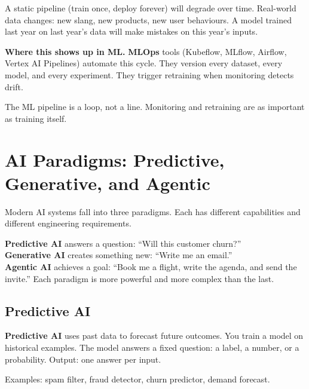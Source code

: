 \documentclass[a4paper,11pt]{article}
\newcommand{\vocab}[1]{\textbf{\color{navy}#1}}
\begin{document}
\begin{watchout}
A static pipeline (train once, deploy forever) will degrade over time.
Real-world data changes: new slang, new products, new user behaviours.
A model trained last year on last year's data will make mistakes on this year's inputs.
\end{watchout}

\noindent\textbf{Where this shows up in ML.}
\vocab{MLOps} tools (Kubeflow, MLflow, Airflow, Vertex AI Pipelines) automate this cycle.
They version every dataset, every model, and every experiment.
They trigger retraining when monitoring detects drift.

\begin{keytake}
The ML pipeline is a loop, not a line.
Monitoring and retraining are as important as training itself.
\end{keytake}

\section{AI Paradigms: Predictive, Generative, and Agentic}

Modern AI systems fall into three paradigms.
Each has different capabilities and different engineering requirements.

\begin{intuition}
\textbf{Predictive AI} answers a question: ``Will this customer churn?'' \\
\textbf{Generative AI} creates something new: ``Write me an email.'' \\
\textbf{Agentic AI} achieves a goal: ``Book me a flight, write the agenda, and send the invite.''
Each paradigm is more powerful and more complex than the last.
\end{intuition}

\subsection{Predictive AI}

\vocab{Predictive AI} uses past data to forecast future outcomes.
You train a model on historical examples.
The model answers a fixed question: a label, a number, or a probability.
Output: one answer per input.

Examples: spam filter, fraud detector, churn predictor, demand forecast.
\end{document}
